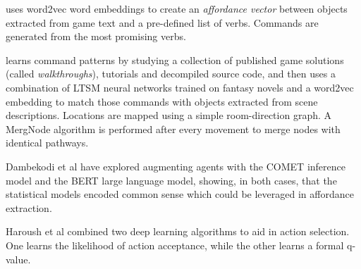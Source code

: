  uses word2vec word embeddings to create an
\emph{affordance vector} between objects extracted from game text and a
pre-defined list of verbs. Commands are generated from the most
promising verbs.\cite{atkinson_text-based_2019}

 learns command patterns by studying a collection of
published game solutions (called \emph{walkthroughs}), tutorials and
decompiled source code, and then uses a combination of LTSM neural
networks trained on fantasy novels and a word2vec embedding to match
those commands with objects extracted from scene
descriptions. Locations are mapped using a simple room-direction graph.
A MergNode algorithm is performed after every movement to merge nodes
with identical pathways\cite{kostka2017text}.

Dambekodi et al have explored augmenting agents with the COMET inference
model and the BERT large language model, showing, in both cases, that
the statistical models encoded common sense which could be leveraged in
affordance extraction\cite{dambekodi_playing_2020}.

Haroush et al combined two deep learning algorithms to aid in action
selection. One learns the likelihood of action acceptance, while the
other learns a formal q-value.
